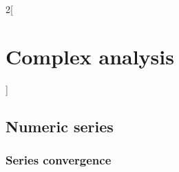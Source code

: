 \documentclass[class=article,crop=false]{standalone}
\begin{document}
\begin{multicols}{2}[\section{Complex analysis}]
\subsection{Numeric series}
\subsubsection*{Series convergence}

\end{multicols}
\end{document}
